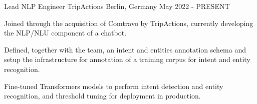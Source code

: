 

\begin{cventries}
  \cventry
    {Lead NLP Engineer} %
    {TripActions} %
    {Berlin, Germany} %
    {May 2022 - PRESENT} %
	{
      \begin{cvitems} %
		\item {Joined through the acquisition of Comtravo by TripActions, currently developing the NLP/NLU component of a chatbot.}
		\item {Defined, together with the team, an intent and entities annotation schema and setup the infrastructure for annotation of a training corpus for intent and entity recognition.}
		\item {Fine-tuned Transformers models to perform intent detection and entity recognition, and threshold tuning for deployment in production.}
      \end{cvitems}
    }



\end{cventries}
